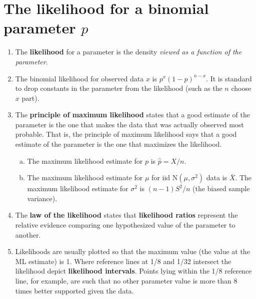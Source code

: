 \documentclass[12pt]{article}
\begin{document}
\section{The likelihood for a binomial parameter $p$}
\begin{enumerate}[1.]
\item The {\bf likelihood} for a parameter is the density {\em viewed
    as a function of the parameter}.
\item The binomial likelihood for observed data $x$ is 
  $p^x (1 - p)^{n - x}$. It is standard to drop constants in the parameter from
  the likelihood (such as the $n$ choose $x$ part).
\item The {\bf principle of maximum likelihood} states that a good estimate of
  the parameter is the one that makes the data that was actually observed most
  probable. That is, the principle of maximum likelihood says that a good estimate
  of the parameter is the one that maximizes the likelihood. 
  \begin{enumerate}[a.]
  \item The maximum likelihood estimate for $p$ is $\hat p = X/n$.
  \item The maximum likelihood estimate for $\mu$ for iid $\mathrm{N}(\mu, \sigma^2)$ data
    is $\bar X$. The maximum likelihood estimate for $\sigma^2$ is $(n - 1) S^2 / n$ (the
    biased sample variance).
  \end{enumerate}
\item The {\bf law of the likelihood} states that {\bf likelihood
    ratios} represent the relative evidence comparing one hypothesized
  value of the parameter to another.
\item Likelihoods are usually plotted so that the maximum value (the
  value at the ML estimate) is 1. Where reference lines at 1/8 and
  1/32 intersect the likelihood depict {\bf likelihood intervals}.
  Points lying within the 1/8 reference line, for example, are such
  that no other parameter value is more than 8 times better supported
  given the data.
\end{enumerate}
\end{document}
